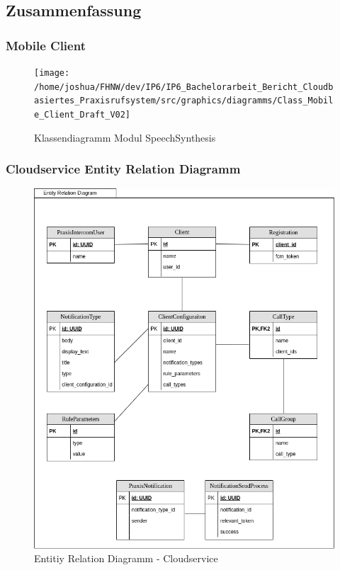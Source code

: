 \subsection{Zusammenfassung}

\subsubsection{Mobile Client}
\begin{figure}[h]
    \centering
    \begin{minipage}[b]{0.92\textwidth}
        \texttt{[image: /home/joshua/FHNW/dev/IP6/IP6\_Bachelorarbeit\_Bericht\_Cloudbasiertes\_Praxisrufsystem/src/graphics/diagramms/Class\_Mobile\_Client\_Draft\_V02]}
        \caption{Klassendiagramm Modul SpeechSynthesis}
    \end{minipage}
\end{figure}
\clearpage

\clearpage

\subsubsection{Cloudservice Entity Relation Diagramm}

\begin{figure}[h]
    \centering
    \begin{minipage}[b]{0.9\textwidth}
        \includegraphics[width=\textwidth]{graphics/diagramms/erd_v02}
        \caption{Entitiy Relation Diagramm - Cloudservice}
    \end{minipage}
\end{figure}

